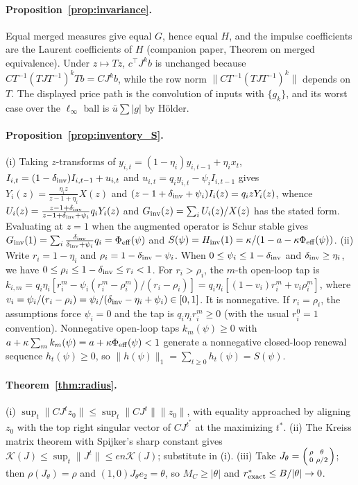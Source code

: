 \documentclass[12pt]{article}
\theoremstyle{definition}
\theoremstyle{remark}
\begin{document}
\paragraph{Proposition~\ref{prop:invariance}.} Equal merged measures give equal $G$, hence equal $H$, and the impulse coefficients are the Laurent coefficients of $H$ (companion paper, Theorem on merged equivalence). Under $z\mapsto Tz$, $c^\top J^kb$ is unchanged because $CT^{-1}(TJT^{-1})^kTb=CJ^kb$, while the row norm $\|CT^{-1}(TJT^{-1})^k\|$ depends on $T$. The displayed price path is the convolution of inputs with $\{g_k\}$, and its worst case over the $\ell_\infty$ ball is $\bar u\sum|g|$ by H\"older.

\paragraph{Proposition~\ref{prop:inventory_S}.} (i) Taking $z$-transforms of $y_{i,t}=(1-\eta_i)y_{i,t-1}+\eta_i x_t$, $I_{i,t}=(1-\delta_{\rm inv})I_{i,t-1}+u_{i,t}$ and $u_{i,t}=q_i y_{i,t}-\psi_i I_{i,t-1}$ gives $Y_i(z)=\frac{\eta_i z}{z-1+\eta_i}X(z)$ and $(z-1+\delta_{\rm inv}+\psi_i)I_i(z)=q_i z Y_i(z)$, whence $U_i(z)=\frac{z-1+\delta_{\rm inv}}{z-1+\delta_{\rm inv}+\psi_i}q_i Y_i(z)$ and $G_{\rm inv}(z)=\sum_i U_i(z)/X(z)$ has the stated form. Evaluating at $z=1$ when the augmented operator is Schur stable gives $G_{\rm inv}(1)=\sum_i \frac{\delta_{\rm inv}}{\delta_{\rm inv}+\psi_i}q_i=\Phi_{\rm eff}(\psi)$ and $S(\psi)=H_{\rm inv}(1)=\kappa/(1-a-\kappa\Phi_{\rm eff}(\psi))$. (ii) Write $r_i=1-\eta_i$ and $\rho_i=1-\delta_{\rm inv}-\psi_i$. When $0\le\psi_i\le 1-\delta_{\rm inv}$ and $\delta_{\rm inv}\ge\eta_i$, we have $0\le\rho_i\le 1-\delta_{\rm inv}\le r_i<1$. For $r_i>\rho_i$, the $m$-th open-loop tap is
$k_{i,m}=q_i\eta_i[r_i^m-\psi_i(r_i^m-\rho_i^m)/(r_i-\rho_i)]
=q_i\eta_i[(1-v_i)r_i^m+v_i\rho_i^m]$, where
$v_i=\psi_i/(r_i-\rho_i)=\psi_i/(\delta_{\rm inv}-\eta_i+\psi_i)\in[0,1]$.
It is nonnegative. If $r_i=\rho_i$, the assumptions force $\psi_i=0$ and the tap is $q_i\eta_i r_i^m\ge0$ (with the usual $r_i^0=1$ convention).
Nonnegative open-loop taps $k_m(\psi)\ge0$ with $a+\kappa\sum_m k_m(\psi)=a+\kappa\Phi_{\rm eff}(\psi)<1$ generate a nonnegative closed-loop renewal sequence $h_t(\psi)\ge0$, so $\|h(\psi)\|_1=\sum_{t\ge0}h_t(\psi)=S(\psi)$.

\paragraph{Theorem~\ref{thm:radius}.} (i) $\sup_t\|CJ^tz_0\|\le\sup_t\|CJ^t\|\|z_0\|$, with equality approached by aligning $z_0$ with the top right singular vector of $CJ^{t^*}$ at the maximizing $t^*$. (ii) The Kreiss matrix theorem with Spijker's sharp constant gives $\mathcal K(J)\le\sup_t\|J^t\|\le en\mathcal K(J)$; substitute in (i). (iii) Take $J_\theta=\begin{psmallmatrix}\rho&\theta\\0&\rho/2\end{psmallmatrix}$; then $\rho(J_\theta)=\rho$ and $(1,0)J_\theta e_2=\theta$, so $M_C\ge|\theta|$ and $r^*_{\rm exact}\le B/|\theta|\to0$.
\end{document}
